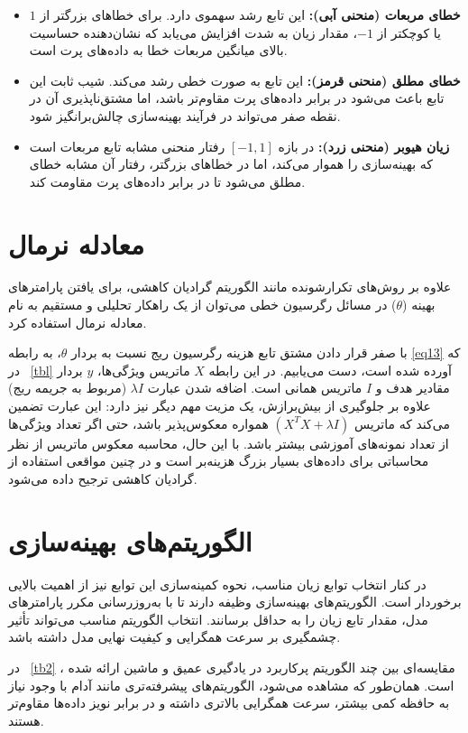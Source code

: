 \begin{itemize}
	\item \textbf{خطای مربعات (منحنی آبی):} این تابع رشد سهموی دارد. برای خطاهای بزرگتر از $1$ یا کوچکتر از $-1$، مقدار زیان به شدت افزایش می‌یابد که نشان‌دهنده حساسیت بالای میانگین مربعات خطا به داده‌های پرت است.
	\item \textbf{خطای مطلق (منحنی قرمز):} این تابع به صورت خطی رشد می‌کند. شیب ثابت این تابع باعث می‌شود در برابر داده‌های پرت مقاوم‌تر باشد، اما مشتق‌ناپذیری آن در نقطه صفر می‌تواند در فرآیند بهینه‌سازی چالش‌برانگیز شود.
	\item \textbf{زیان هیوبر (منحنی زرد):} در بازه $[-1, 1]$ رفتار منحنی مشابه تابع مربعات است که بهینه‌سازی را هموار می‌کند، اما در خطاهای بزرگتر، رفتار آن مشابه خطای مطلق می‌شود تا در برابر داده‌های پرت مقاومت کند.
\end{itemize}


\section{معادله نرمال}\label{sec:3-4}
علاوه بر روش‌های تکرارشونده مانند الگوریتم گرادیان کاهشی، برای یافتن پارامترهای بهینه ($\theta$) در مسائل رگرسیون خطی می‌توان از یک راهکار تحلیلی و مستقیم به نام معادله نرمال استفاده کرد. 

با صفر قرار دادن مشتق تابع هزینه رگرسیون ریج نسبت به بردار $\theta$، به رابطه \eqref{eq13} که در \tablename~\ref{tbl} آورده شده است، دست می‌یابیم. در این رابطه $X$ ماتریس ویژگی‌ها، $y$ بردار مقادیر هدف و $I$ ماتریس همانی است. 
اضافه شدن عبارت $\lambda I$ (مربوط به جریمه ریج) علاوه بر جلوگیری از بیش‌برازش، یک مزیت مهم دیگر نیز دارد: این عبارت تضمین می‌کند که ماتریس $(X^T X + \lambda I)$ همواره معکوس‌پذیر باشد، حتی اگر تعداد ویژگی‌ها از تعداد نمونه‌های آموزشی بیشتر باشد. با این حال، محاسبه معکوس ماتریس از نظر محاسباتی برای داده‌های بسیار بزرگ هزینه‌بر است و در چنین مواقعی استفاده از گرادیان کاهشی ترجیح داده می‌شود.

\section{الگوریتم‌های بهینه‌سازی}\label{sec:3-5}
در کنار انتخاب توابع زیان مناسب، نحوه کمینه‌سازی این توابع نیز از اهمیت بالایی برخوردار است. الگوریتم‌های بهینه‌سازی وظیفه دارند تا با به‌روزرسانی مکرر پارامترهای مدل، مقدار تابع زیان را به حداقل برسانند. انتخاب الگوریتم مناسب می‌تواند تأثیر چشمگیری بر سرعت همگرایی و کیفیت نهایی مدل داشته باشد. 

در \tablename~\ref{tb2} ، مقایسه‌ای بین چند الگوریتم پرکاربرد در یادگیری عمیق و ماشین ارائه شده است. همان‌طور که مشاهده می‌شود، الگوریتم‌های پیشرفته‌تری مانند آدام با وجود نیاز به حافظه کمی بیشتر، سرعت همگرایی بالاتری داشته و در برابر نویز داده‌ها مقاوم‌تر هستند.\cite{kingma2014adam}

